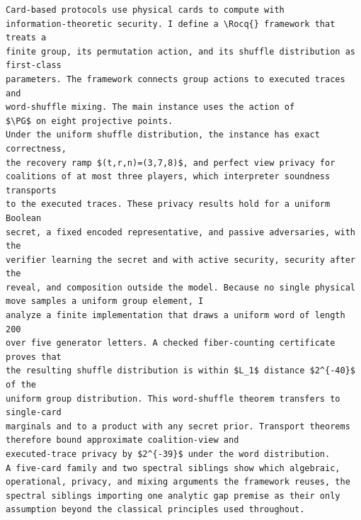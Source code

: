 \documentclass[10pt]{article}
\newcommand{\Rocq}{Rocq}\newcommand{\coqin}[1]{\texttt{#1}}\newcommand{\PG}{\mathrm{PGL}(2,7)}\newcommand{\worddist}{\mu^{*L}}
\begin{document}
\begin{lstlisting}
Card-based protocols use physical cards to compute with
information-theoretic security. I define a \Rocq{} framework that treats a
finite group, its permutation action, and its shuffle distribution as first-class
parameters. The framework connects group actions to executed traces and
word-shuffle mixing. The main instance uses the action of
$\PG$ on eight projective points.
Under the uniform shuffle distribution, the instance has exact correctness,
the recovery ramp $(t,r,n)=(3,7,8)$, and perfect view privacy for
coalitions of at most three players, which interpreter soundness transports
to the executed traces. These privacy results hold for a uniform Boolean
secret, a fixed encoded representative, and passive adversaries, with the
verifier learning the secret and with active security, security after the
reveal, and composition outside the model. Because no single physical move samples a uniform group element, I
analyze a finite implementation that draws a uniform word of length 200
over five generator letters. A checked fiber-counting certificate proves that
the resulting shuffle distribution is within $L_1$ distance $2^{-40}$ of the
uniform group distribution. This word-shuffle theorem transfers to single-card
marginals and to a product with any secret prior. Transport theorems therefore bound approximate coalition-view and
executed-trace privacy by $2^{-39}$ under the word distribution.
A five-card family and two spectral siblings show which algebraic,
operational, privacy, and mixing arguments the framework reuses, the
spectral siblings importing one analytic gap premise as their only
assumption beyond the classical principles used throughout.
\end{lstlisting}
\end{document}
